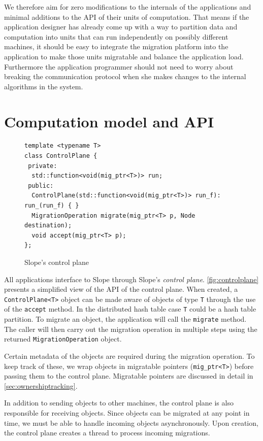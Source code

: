 We therefore aim for zero modifications to the
internals of the applications and minimal additions to the API of their
units of computation. That means if the application designer has already come up
with a way to partition data and computation into units that can run
independently on possibly different machines, it should be easy to
integrate the migration platform into the application to make those units
migratable and balance the application load. Furthermore the
application programmer should not need to worry about breaking the communication
protocol when she makes changes to the internal algorithms in the system.

\section{Computation model and API}
\label{sec:api}

\begin{figure}[t]
\begin{lstlisting}
template <typename T>
class ControlPlane {
 private:
  std::function<void(mig_ptr<T>)> run;
 public:
  ControlPlane(std::function<void(mig_ptr<T>)> run_f): run_(run_f) { }
  MigrationOperation migrate(mig_ptr<T> p, Node destination);
  void accept(mig_ptr<T> p);
};
\end{lstlisting}
\caption{
    Slope's control plane
}
\label{fig:controlplane}
\end{figure}

All applications interface to Slope through Slope's \emph{control plane}.
\autoref{fig:controlplane} presents a simplified view of the API of the
control plane. When created, a \texttt{ControlPlane<T>} object can be
made aware of objects of type \texttt{T} through the use of the \texttt{accept}
method. In the distributed hash table case \texttt{T} could be a hash table
partition. To migrate an object, the application will call the \texttt{migrate}
method. The caller will then carry out the migration operation in multiple
steps using the returned \texttt{MigrationOperation} object.

Certain metadata of the objects are required during the migration
operation. To keep track of these, we wrap objects in
migratable pointers (\texttt{mig\_ptr<T>}) before passing them to the control
plane. Migratable pointers are discussed in detail in \autoref{sec:ownershiptracking}.

In addition to sending objects to other machines, the control plane is also
responsible for receiving objects. Since objects can be migrated at any point
in time, we must be able to handle incoming objects asynchronously. Upon
creation, the control plane creates a thread to process incoming migrations.

